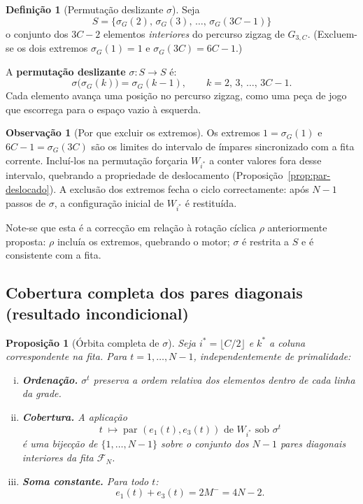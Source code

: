 \documentclass[12pt, a4paper]{article}
\theoremstyle{plain}
\newtheorem{proposition}[theorem]{Proposição}
\theoremstyle{definition}
\newtheorem{definition}[theorem]{Definição}
\newtheorem{remark}[theorem]{Observação}
\theoremstyle{remark}
\begin{document}
	\begin{definition}[Permutação deslizante $\sigma$]
		\label{def:sigma}
		Seja
		\[
		S = \bigl\{\sigma_G(2),\,\sigma_G(3),\,\ldots,\,
		\sigma_G(3C-1)\bigr\}
		\]
		o conjunto dos $3C-2$ elementos \emph{interiores} do percurso
		zigzag de $G_{3,C}$.  (Excluem-se os dois extremos
		$\sigma_G(1)=1$ e $\sigma_G(3C)=6C-1$.)
		
		A \textbf{permutação deslizante} $\sigma:S\to S$ é:
		\[
		\sigma\bigl(\sigma_G(k)\bigr) = \sigma_G(k-1),
		\qquad k = 2,\,3,\,\ldots,\,3C-1.
		\]
		Cada elemento avança uma posição no percurso zigzag, como uma
		peça de jogo que escorrega para o espaço vazio à esquerda.
	\end{definition}
	
	\begin{remark}[Por que excluir os extremos]
		\label{rem:extremos}
		Os extremos $1=\sigma_G(1)$ e $6C-1=\sigma_G(3C)$ são os limites
		do intervalo de ímpares sincronizado com a fita corrente.
		Incluí-los na permutação forçaria $W_{i^*}$ a conter valores fora
		desse intervalo, quebrando a propriedade de deslocamento
		(Proposição~\ref{prop:par-deslocado}).  A exclusão dos extremos
		fecha o ciclo correctamente: após $N-1$ passos de $\sigma$, a
		configuração inicial de $W_{i^*}$ é restituída.
		
		Note-se que esta é a correcção em relação à rotação cíclica $\rho$
		anteriormente proposta: $\rho$ incluía os extremos, quebrando o
		motor; $\sigma$ é restrita a $S$ e é consistente com a fita.
	\end{remark}
	
	\subsection{Cobertura completa dos pares diagonais
		(resultado incondicional)}
	
	\begin{proposition}[Órbita completa de $\sigma$]
		\label{prop:orbita}
		Seja $i^*=\lfloor C/2\rfloor$ e $k^*$ a coluna correspondente
		na fita.  Para $t=1,\ldots,N-1$, independentemente de primalidade:
		\begin{enumerate}[(i)]
			\item \textbf{Ordenação.}  $\sigma^t$ preserva a ordem relativa
			dos elementos dentro de cada linha da grade.
			\item \textbf{Cobertura.}  A aplicação
			\[
			t \;\mapsto\;
			\text{par }(e_1(t),e_3(t))\text{ de }W_{i^*}
			\text{ sob }\sigma^t
			\]
			é uma bijecção de $\{1,\ldots,N-1\}$ sobre o conjunto
			dos $N-1$ pares diagonais interiores da fita
			$\mathcal{F}_N$.
			\item \textbf{Soma constante.}  Para todo $t$:
			\[
			e_1(t) + e_3(t) = 2M^- = 4N-2.
			\]
		\end{enumerate}
	\end{proposition}
	
\end{document}
